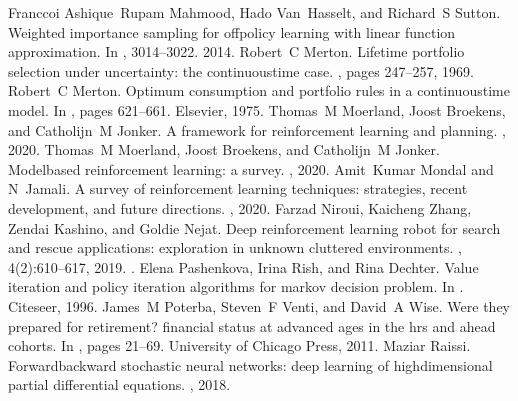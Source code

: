 \documentclass[letterpaper,10pt,english]{jupyterBook}
\begin{document}
\begin{sphinxthebibliography}{Franccoi}
Ashique Rupam Mahmood, Hado Van Hasselt, and Richard S Sutton. Weighted importance sampling for off\sphinxhyphen{}policy learning with linear function approximation. In , 3014–3022. 2014.
\sphinxAtStartPar
Robert C Merton. Lifetime portfolio selection under uncertainty: the continuous\sphinxhyphen{}time case. , pages 247–257, 1969.
\sphinxAtStartPar
Robert C Merton. Optimum consumption and portfolio rules in a continuous\sphinxhyphen{}time model. In , pages 621–661. Elsevier, 1975.
\sphinxAtStartPar
Thomas M Moerland, Joost Broekens, and Catholijn M Jonker. A framework for reinforcement learning and planning. , 2020.
\sphinxAtStartPar
Thomas M Moerland, Joost Broekens, and Catholijn M Jonker. Model\sphinxhyphen{}based reinforcement learning: a survey. , 2020.
\sphinxAtStartPar
Amit Kumar Mondal and N Jamali. A survey of reinforcement learning techniques: strategies, recent development, and future directions. , 2020.
\sphinxAtStartPar
Farzad Niroui, Kaicheng Zhang, Zendai Kashino, and Goldie Nejat. Deep reinforcement learning robot for search and rescue applications: exploration in unknown cluttered environments. , 4(2):610–617, 2019. .
\sphinxAtStartPar
Elena Pashenkova, Irina Rish, and Rina Dechter. Value iteration and policy iteration algorithms for markov decision problem. In . Citeseer, 1996.
\sphinxAtStartPar
James M Poterba, Steven F Venti, and David A Wise. Were they prepared for retirement? financial status at advanced ages in the hrs and ahead cohorts. In , pages 21–69. University of Chicago Press, 2011.
\sphinxAtStartPar
Maziar Raissi. Forward\sphinxhyphen{}backward stochastic neural networks: deep learning of high\sphinxhyphen{}dimensional partial differential equations. , 2018.

\end{sphinxthebibliography}
\end{document}
